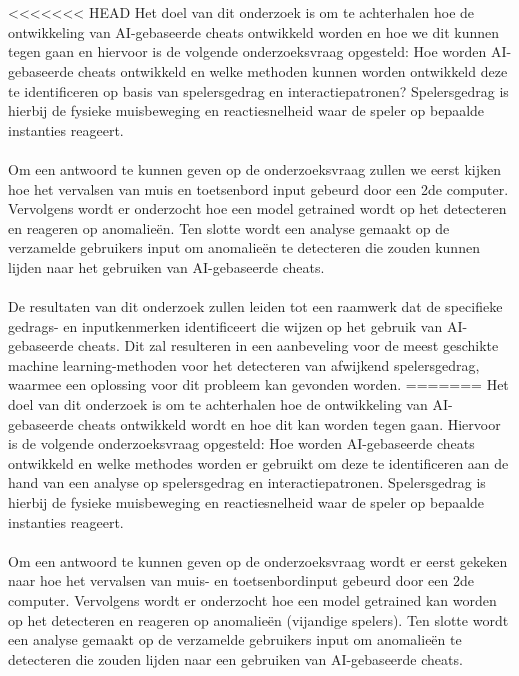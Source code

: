 
\chapter{}%
\label{ch:inleiding}


<<<<<<< HEAD
Het doel van dit onderzoek is om te achterhalen hoe de ontwikkeling van AI-gebaseerde cheats ontwikkeld worden en hoe we dit kunnen tegen gaan en hiervoor is de volgende onderzoeksvraag opgesteld: Hoe worden AI-gebaseerde cheats ontwikkeld en welke methoden kunnen worden ontwikkeld deze te identificeren op basis van spelersgedrag en interactiepatronen? Spelersgedrag is hierbij de fysieke muisbeweging en reactiesnelheid waar de speler op bepaalde instanties reageert.
\\\\
Om een antwoord te kunnen geven op de onderzoeksvraag zullen we eerst kijken hoe het vervalsen van muis en toetsenbord input gebeurd door een 2de computer. Vervolgens wordt er onderzocht hoe een model getrained wordt op het detecteren en reageren op anomalieën. Ten slotte wordt een analyse gemaakt op de verzamelde gebruikers input om anomalieën te detecteren die zouden kunnen lijden naar het gebruiken van AI-gebaseerde cheats. 
\\\\
De resultaten van dit onderzoek zullen leiden tot een raamwerk dat de specifieke gedrags- en inputkenmerken identificeert die wijzen op het gebruik van AI-gebaseerde cheats. Dit zal resulteren in een aanbeveling voor de meest geschikte machine learning-methoden voor het detecteren van afwijkend spelersgedrag, waarmee een oplossing voor dit probleem kan gevonden worden.
=======
Het doel van dit onderzoek is om te achterhalen hoe de ontwikkeling van AI-gebaseerde cheats ontwikkeld wordt en hoe dit kan worden tegen gaan.
Hiervoor is de volgende onderzoeksvraag opgesteld: Hoe worden AI-gebaseerde cheats ontwikkeld en welke methodes worden er gebruikt om deze te identificeren aan de hand van een analyse op spelersgedrag en interactiepatronen.
Spelersgedrag is hierbij de fysieke muisbeweging en reactiesnelheid waar de speler op bepaalde instanties reageert.
\\\\
Om een antwoord te kunnen geven op de onderzoeksvraag wordt er eerst gekeken naar hoe het vervalsen van muis- en toetsenbordinput gebeurd door een 2de computer. Vervolgens wordt er onderzocht hoe een model getrained kan worden op het detecteren en reageren op anomalieën (vijandige spelers). Ten slotte wordt een analyse gemaakt op de verzamelde gebruikers input om anomalieën te detecteren die zouden lijden naar een gebruiken van AI-gebaseerde cheats. 
